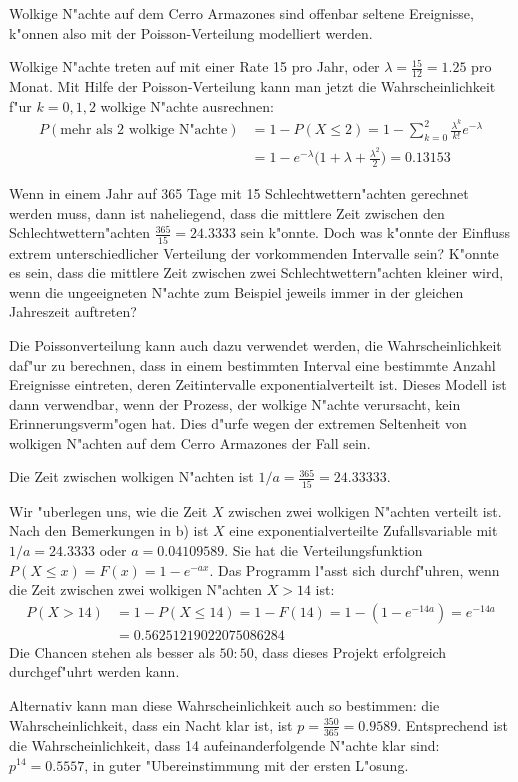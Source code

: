 \begin{loesung}
Wolkige N"achte auf dem Cerro Armazones sind offenbar seltene
Ereignisse, k"onnen also mit der Poisson-Verteilung modelliert
werden.
\begin{teilaufgaben}
\item Wolkige N"achte treten auf mit einer Rate 15 pro Jahr, oder
$\lambda=\frac{15}{12}=1.25$ pro Monat. Mit Hilfe der Poisson-Verteilung
kann man jetzt die Wahrscheinlichkeit f"ur $k=0,1,2$ wolkige N"achte
ausrechnen:
\begin{align*}
P(\text{mehr als 2 wolkige N"achte})
&=1-P(X\le 2)
=
1-\sum_{k=0}^2\frac{\lambda^k}{k!}e^{-\lambda}
\\
&=1-e^{-\lambda}\biggl(1+\lambda+\frac{\lambda^2}2\biggr)
=0.13153
\end{align*}
\item 
Wenn in einem Jahr auf 365 Tage mit 15 Schlechtwettern"achten gerechnet
werden muss, dann ist naheliegend, dass die  mittlere Zeit zwischen
den Schlechtwettern"achten $\frac{365}{15}=24.3333$ sein k"onnte.
Doch was k"onnte der Einfluss extrem unterschiedlicher Verteilung
der vorkommenden Intervalle sein? K"onnte es sein, dass die mittlere
Zeit zwischen zwei Schlechtwettern"achten kleiner wird, wenn die
ungeeigneten N"achte zum Beispiel jeweils immer in der gleichen Jahreszeit
auftreten?

Die Poissonverteilung kann auch dazu verwendet werden, die Wahrscheinlichkeit
daf"ur zu berechnen, dass in einem bestimmten Interval eine bestimmte
Anzahl Ereignisse eintreten, deren Zeitintervalle exponentialverteilt ist.
Dieses Modell ist dann verwendbar, wenn der Prozess, der wolkige N"achte
verursacht, kein Erinnerungsverm"ogen hat. Dies d"urfe wegen der extremen
Seltenheit von wolkigen N"achten auf dem Cerro Armazones der Fall sein.

Die Zeit zwischen wolkigen N"achten ist $1/a=\frac{365}{15}=24.33333$.
\item
Wir "uberlegen uns, wie
die Zeit $X$ zwischen zwei wolkigen N"achten verteilt ist. Nach den Bemerkungen
in b) ist $X$ eine exponentialverteilte Zufallsvariable mit $1/a=24.3333$
oder $a=0.04109589$.
Sie hat die Verteilungsfunktion
$
P(X\le x)=
F(x)=1-e^{-ax}.
$
Das Programm l"asst sich durchf"uhren, wenn die Zeit zwischen zwei
wolkigen N"achten $X> 14$ ist:
\begin{align*}
P(X> 14)&=1-P(X\le 14)=1-F(14)=1-(1-e^{-14a})=e^{-14a}
\\
&= 0.56251219022075086284
\end{align*}
Die Chancen stehen als besser als $50:50$, dass dieses Projekt
erfolgreich durchgef"uhrt werden kann.

Alternativ kann man diese Wahrscheinlichkeit auch so bestimmen:
die Wahrscheinlichkeit, dass ein Nacht klar ist, ist $p=\frac{350}{365}=0.9589$.
Entsprechend ist die Wahrscheinlichkeit, dass 14 aufeinanderfolgende
N"achte klar sind: $p^{14}=0.5557$, in guter "Ubereinstimmung mit der
ersten L"osung.
\qedhere
\end{teilaufgaben}
\end{loesung}

